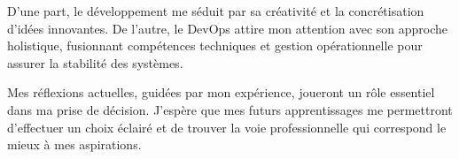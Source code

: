D'une part, le développement me séduit par sa créativité et la concrétisation d'idées innovantes.
De l'autre, le DevOps attire mon attention avec son approche holistique, fusionnant compétences techniques et gestion opérationnelle pour assurer la stabilité des systèmes.

Mes réflexions actuelles, guidées par mon expérience, joueront un rôle essentiel dans ma prise de décision.
J'espère que mes futurs apprentissages me permettront d'effectuer un choix éclairé et de trouver la voie professionnelle qui correspond le mieux à mes aspirations.
